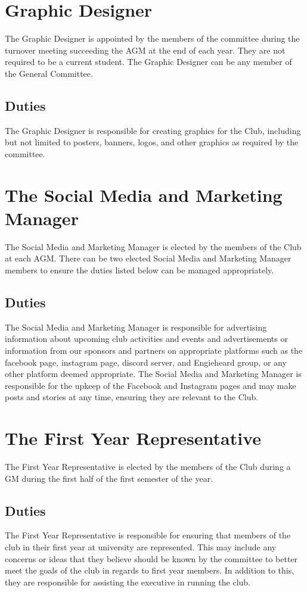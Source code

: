 \documentclass[11pt]{article}
\begin{document}
\section{Graphic Designer} 
The Graphic Designer is appointed by the members of the committee during the turnover meeting succeeding the AGM at the end of each year. They are not required to be a current student. The Graphic Designer can be any member of the General Committee.
\subsection{Duties}
The Graphic Designer is responsible for creating graphics for the Club, including but not limited to posters, banners, logos, and other graphics as required by the committee.
\section{The Social Media and Marketing Manager}
The Social Media and Marketing Manager is elected by the members of the Club at each AGM. There can be two elected Social Media and Marketing Manager members to ensure the duties listed below can be managed appropriately.
\subsection{Duties}
The Social Media and Marketing Manager is responsible for advertising information about upcoming club activities and events and advertisements or information from our sponsors and partners on appropriate platforms such as the facebook page, instagram page, discord server, and Engieheard group, or any other platform deemed appropriate.
The Social Media and Marketing Manager is responsible for the upkeep of the Facebook and Instagram pages and may make posts and stories at any time, ensuring they are relevant to the Club.

\section{The First Year Representative}
The First Year Representative is elected by the members of the Club during a GM during the first half of the first semester of the year.
\subsection{Duties}
The First Year Representative is responsible for ensuring that members of the club in their first year at university are represented. This may include any concerns or ideas that they believe should be known by the committee to better meet the goals of the club in regards to first year members. In addition to this, they are responsible for assisting the executive in running the club.
\end{document}
